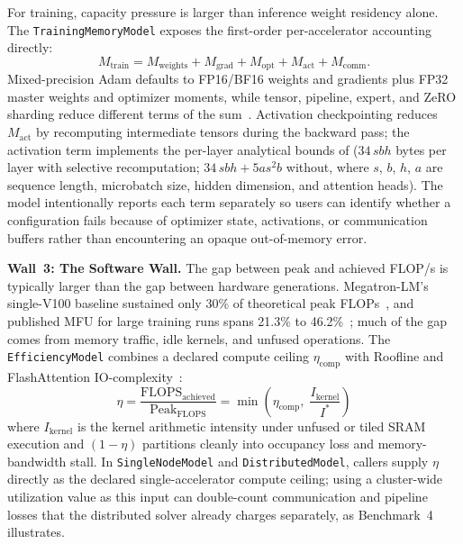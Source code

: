 \documentclass[10pt,twocolumn]{article}
\begin{document}
For training, capacity pressure is larger than inference weight residency alone. The \texttt{TrainingMemoryModel} exposes the first-order per-accelerator accounting directly:
\begin{equation}
\label{eq:training-memory}
M_{\text{train}} =
M_{\text{weights}} + M_{\text{grad}} + M_{\text{opt}} +
M_{\text{act}} + M_{\text{comm}}.
\end{equation}
Mixed-precision Adam defaults to FP16/BF16 weights and gradients plus FP32 master weights and optimizer moments, while tensor, pipeline, expert, and ZeRO sharding reduce different terms of the sum~\citep{shoeybi2019megatron,rajbhandari2020}. Activation checkpointing reduces $M_{\text{act}}$ by recomputing intermediate tensors during the backward pass; the activation term implements the per-layer analytical bounds of \citet{korthikanti2023} ($34\,sbh$ bytes per layer with selective recomputation; $34\,sbh + 5as^2b$ without, where $s$, $b$, $h$, $a$ are sequence length, microbatch size, hidden dimension, and attention heads). The model intentionally reports each term separately so users can identify whether a configuration fails because of optimizer state, activations, or communication buffers rather than encountering an opaque out-of-memory error.

\textbf{Wall~3: The Software Wall.} The gap between peak and achieved FLOP/s is typically larger than the gap between hardware generations. Megatron-LM's single-V100 baseline sustained only 30\% of theoretical peak FLOPs~\citep{shoeybi2019megatron}, and published MFU for large training runs spans 21.3\% to 46.2\%~\citep{chowdhery2022palm}; much of the gap comes from memory traffic, idle kernels, and unfused operations. The \texttt{EfficiencyModel} combines a declared compute ceiling $\eta_{\text{comp}}$ with Roofline and FlashAttention IO-complexity~\citep{dao2022}:
\begin{equation}
\label{eq:efficiency}
\eta = \frac{\text{FLOPS}_{\text{achieved}}}{\text{Peak}_{\text{FLOPS}}} = \min\!\left(\eta_{\text{comp}},\; \frac{I_{\text{kernel}}}{I^{*}}\right)
\end{equation}
where $I_{\text{kernel}}$ is the kernel arithmetic intensity under unfused or tiled SRAM execution and $(1 - \eta)$ partitions cleanly into occupancy loss and memory-bandwidth stall. In \texttt{SingleNodeModel} and \texttt{DistributedModel}, callers supply $\eta$ directly as the declared single-accelerator compute ceiling; using a cluster-wide utilization value as this input can double-count communication and pipeline losses that the distributed solver already charges separately, as Benchmark~4 illustrates.
\end{document}
